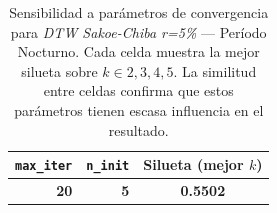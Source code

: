 \begin{table}[ht]
  \centering
  \caption{Sensibilidad a parámetros de convergencia para \textit{DTW Sakoe-Chiba r=5\%} — Período Nocturno. Cada celda muestra la mejor silueta sobre $k \in {2,3,4,5}$. La similitud entre celdas confirma que estos parámetros tienen escasa influencia en el resultado.}
  \label{tab:tuning_conv_nighttime}
  \begin{tabular}{rrc}
    \toprule
    \textbf{\texttt{max\_iter}} & \textbf{\texttt{n\_init}} & \textbf{Silueta (mejor $k$)} \\
    \midrule
    \textbf{20} & \textbf{5} & \textbf{0.5502} \\
    \bottomrule
  \end{tabular}
\end{table}


